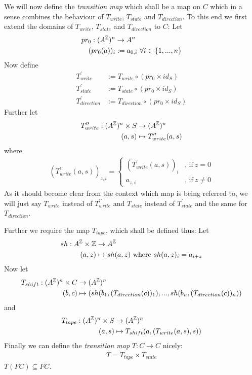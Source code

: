 We will now define the \emph{transition map} which shall be a map on $C$ which in a sense combines the behaviour of $T_{write}$, $T_{state}$ and $T_{direction}$.
To this end we first extend the domains of $T_{write}$, $T_{state}$ and $T_{direction}$ to $C$:
Let 
\begin{align*}
	pr_0: (A^{\mathbb{Z}})^n &\to A^n \\
	 (pr_0(a))_i &:= a_{0,i}~\forall i \in \{1,...,n\}
\end{align*}
Now define
\begin{align*}
	T_{write}^\prime &:= T_{write} \circ (pr_0 \times id_S) \\
	T_{state}^\prime &:= T_{state} \circ (pr_0 \times id_S) \\
	T_{direction}^\prime &:= T_{direction} \circ (pr_0 \times id_S)
\end{align*}
Further let
\begin{align*}
	T_{write}^{\prime\prime}: (A^{\mathbb{Z}})^n \times S &\to (A^{\mathbb{Z}})^n \\
	(a,s) &\mapsto T_{write}^{\prime\prime}(a,s) \\
\end{align*}
where
\begin{align*}
	(T_{write}^{\prime\prime}(a,s))_{z,i} =
	\begin{cases}
		(T_{write}^\prime(a,s))_i &\text{, if}~z = 0 \\
		a_{z,i} &\text{, if}~z \neq 0
	\end{cases}
\end{align*}
As it should become clear from the context which map is being referred to, we will just say $T_{write}$ instead of $T_{write}^{\prime\prime}$
and $T_{state}$ instead of $T_{state}^{\prime}$
and the same for $T_{direction}$.

Further we require the map $T_{tape}$, which shall be defined thus:
Let
\begin{align*}
	sh: A^{\mathbb{Z}} \times \mathbb{Z} &\to A^{\mathbb{Z}} \\
	(a,z) &\mapsto sh(a,z)~\text{where}~sh(a,z)_i = a_{i+z}
\end{align*}
Now let
\begin{align*}
	T_{shift}: (A^{\mathbb{Z}})^n \times C &\to (A^{\mathbb{Z}})^n \\
	(b,c) &\mapsto ( sh(b_1,(T_{direction}(c))_1) , ... , sh(b_n,(T_{direction}(c))_n) )
\end{align*}
and
\begin{align*}
	T_{tape}: (A^{\mathbb{Z}})^n \times S &\to (A^{\mathbb{Z}})^n \\
	(a,s) &\mapsto T_{shift} ( a, (T_{write} (a,s) , s))
\end{align*}
Finally we can define the \emph{transition map} $T:C\to C$ nicely:
\begin{align*}
	T = T_{tape} \times T_{state}
\end{align*}
\remark $T(FC) \subseteq FC$.

